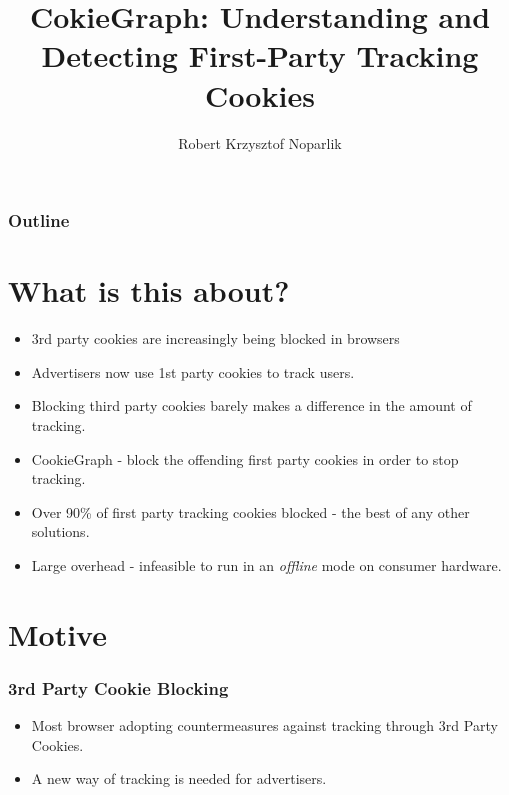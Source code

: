 \documentclass{beamer}
\title{CokieGraph:
Understanding and Detecting First-Party Tracking Cookies}
\author{Robert Krzysztof Noparlik}
\begin{document}
\begin{frame}
\titlepage
\end{frame}

\begin{frame}
\frametitle{Outline}
\tableofcontents
\end{frame}


\section{What is this about?}

\begin{frame}
\begin{itemize}
\item 3rd party cookies are increasingly being blocked in browsers
\item Advertisers now use 1st party cookies to track users. 
\item Blocking third party cookies barely makes a difference in the amount of tracking.
\item CookieGraph - block the offending first party cookies in order to stop tracking.
\end{itemize}
\end{frame}

\begin{frame}
\begin{itemize}
\item Over 90\% of first party tracking cookies blocked - the best of any other solutions.
\item Large overhead - infeasible to run in an \textit{offline} mode on consumer hardware.
\end{itemize}
\end{frame}


\section{Motive}

\begin{frame}
\frametitle{3rd Party Cookie Blocking}

\begin{itemize}
\item Most browser adopting countermeasures against tracking through 3rd Party Cookies.
\item A new way of tracking is needed for advertisers.
\end{itemize}

\end{frame}
\end{document}
